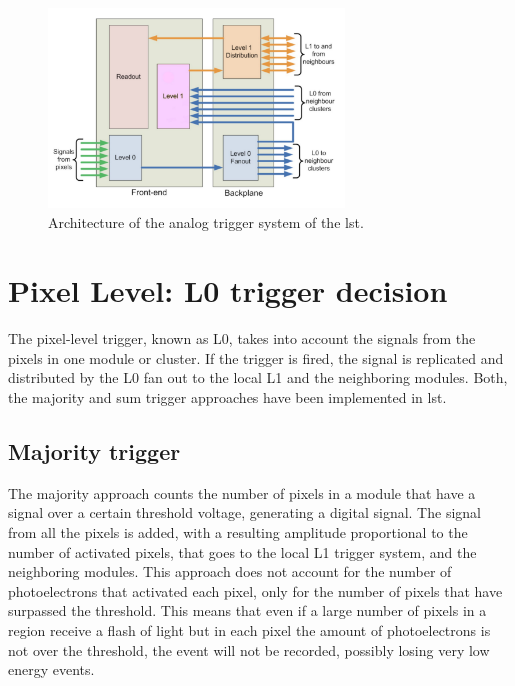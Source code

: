 \documentclass[main.tex]{subfiles}
\begin{document}
\begin{figure}[h]
  \centering
  \includegraphics[width=0.7\textwidth]{./Pictures/triggerscheme.pdf}
  \caption{Architecture of the analog trigger system of the \gls{lst}.}
  \label{fig:trigger}
\end{figure}


\section{Pixel Level: L0 trigger decision}

The pixel-level trigger, known as L0, takes into account the signals from the pixels in one module or cluster. If the trigger is fired, the signal is replicated and distributed by the L0 fan out to the local L1 and the neighboring modules. Both, the majority and sum trigger approaches have been implemented in \gls{lst}.

\subsection{Majority trigger}

The majority approach counts the number of pixels in a module that have a signal over a certain threshold voltage, generating a digital signal. The signal from all the pixels is added, with a resulting amplitude proportional to the number of activated pixels, that goes to the local L1 trigger system, and the neighboring modules. This approach does not account for the number of photoelectrons that activated each pixel, only for the number of pixels that have surpassed the threshold. This means that even if a large number of pixels in a region receive a flash of light but in each pixel the amount of photoelectrons is not over the threshold, the event will not be recorded, possibly losing very low energy events.
\end{document}
